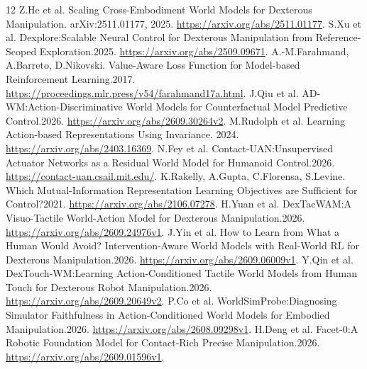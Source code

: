 \documentclass[10 pt]{article}
\begin{document}
\begin{thebibliography}{12}
 Z.He et al. Scaling Cross-Embodiment World Models for Dexterous Manipulation.
arXiv:2511.01177, 2025. \url{https://arxiv.org/abs/2511.01177}.
 S.Xu et al. Dexplore:Scalable Neural Control for Dexterous Manipulation
from Reference-Scoped Exploration.2025. \url{https://arxiv.org/abs/2509.09671}.
 A.-M.Farahmand, A.Barreto, D.Nikovski. Value-Aware Loss Function
for Model-based Reinforcement Learning.2017. \url{https://proceedings.mlr.press/v54/farahmand17a.html}.
 J.Qiu et al. AD-WM:Action-Discriminative World Models for Counterfactual
Model Predictive Control.2026. \url{https://arxiv.org/abs/2609.30264v2}.
 M.Rudolph et al. Learning Action-based Representations Using Invariance.
2024. \url{https://arxiv.org/abs/2403.16369}.
 N.Fey et al. Contact-UAN:Unsupervised Actuator Networks as a Residual
World Model for Humanoid Control.2026. \url{https://contact-uan.csail.mit.edu/}.
 K.Rakelly, A.Gupta, C.Florensa, S.Levine. Which Mutual-Information
Representation Learning Objectives are Sufficient for Control?2021.
\url{https://arxiv.org/abs/2106.07278}.
 H.Yuan et al. DexTacWAM:A Visuo-Tactile World-Action Model for
Dexterous Manipulation.2026. \url{https://arxiv.org/abs/2609.24976v1}.
 J.Yin et al. How to Learn from What a Human Would Avoid?
Intervention-Aware World Models with Real-World RL for Dexterous Manipulation.2026.
\url{https://arxiv.org/abs/2609.06009v1}.
 Y.Qin et al. DexTouch-WM:Learning Action-Conditioned Tactile World
Models from Human Touch for Dexterous Robot Manipulation.2026.
\url{https://arxiv.org/abs/2609.20649v2}.
 P.Co et al. WorldSimProbe:Diagnosing Simulator Faithfulness in
Action-Conditioned World Models for Embodied Manipulation.2026.
\url{https://arxiv.org/abs/2608.09298v1}.
 H.Deng et al. Facet-0:A Robotic Foundation Model for Contact-Rich
Precise Manipulation.2026. \url{https://arxiv.org/abs/2609.01596v1}.
\end{thebibliography}
\end{document}
